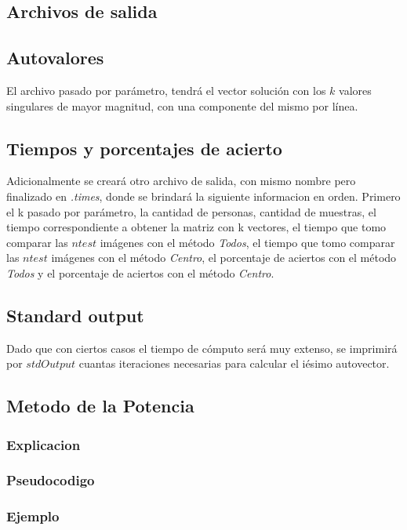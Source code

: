 \subsection{Archivos de salida}
\subsection{Autovalores}
El archivo pasado por par\'ametro, tendr\'a el vector soluci\'on con los $k$ valores singulares de mayor magnitud, con una
componente del mismo por l\'inea.

\subsection{Tiempos y porcentajes de acierto}
Adicionalmente se crear\'a otro archivo de salida, con mismo nombre pero finalizado en \emph{.times}, donde se brindar\'a la siguiente informacion en orden. Primero el k pasado por par\'ametro, la cantidad de personas, cantidad de muestras, el tiempo correspondiente a obtener la matriz con k vectores, el tiempo que tomo comparar las $ntest$ im\'agenes con el m\'etodo \emph{Todos}, el tiempo que tomo comparar las $ntest$ im\'agenes con el m\'etodo \emph{Centro}, el porcentaje de aciertos con el m\'etodo \emph{Todos} y el porcentaje de aciertos con el m\'etodo \emph{Centro}.

\subsection{Standard output}
Dado que con ciertos casos el tiempo de c\'omputo ser\'a muy extenso, se imprimir\'a por $stdOutput$ cuantas iteraciones necesarias para calcular el i\'esimo autovector.

\subsection{Metodo de la Potencia}

  \subsubsection{Explicacion}
  
  \subsubsection{Pseudocodigo}
  
  \subsubsection{Ejemplo}
  

